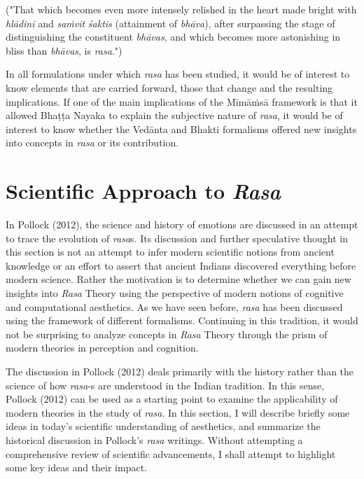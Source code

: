 ("That which becomes even more intensely relished in the heart made bright with \textsl{hlādinī} and \textsl{saṁvit} \textsl{śaktis} (attainment of \textsl{bhāva}), after surpassing the stage of distinguishing the constituent \textsl{bhāvas}, and which becomes more astonishing in bliss than \textsl{bhāvas}, is \textsl{rasa}.")

In all formulations under which \textsl{rasa} has been studied, it would be of interest to know elements that are carried forward, those that change and the resulting implications. If one of the main implications of the Mīmāṁsā framework is that it allowed Bhaṭṭa Nayaka to explain the subjective nature of \textsl{rasa}, it would be of interest to know whether the Vedānta and Bhakti formalisms offered new insights into concepts in \textsl{rasa} or its contribution.\\[-20pt]  

\section*{Scientific Approach to \textsl{Rasa}}

In Pollock (2012), the science and history of emotions are discussed in an attempt to trace the evolution of \textsl{rasa}s. Its discussion and further speculative thought in this section is not an attempt to infer modern scientific notions from ancient knowledge or an effort to assert that ancient Indians discovered everything before modern science. Rather the motivation is to determine whether we can gain new insights into \textsl{Rasa} Theory using the perspective of modern notions of cognitive and computational aesthetics. As we have seen before, \textsl{rasa} has been discussed using the framework of different formalisms. Continuing in this tradition, it would not be surprising to analyze concepts in \textsl{Rasa} Theory through the prism of modern theories in perception and cognition. 

The discussion in Pollock (2012) deals primarily with the history rather than the science of how \textsl{rasa}-s are understood in the Indian tradition. In this sense, Pollock (2012) can be used as a starting point to examine the applicability of modern theories in the study of \textsl{rasa}. In this section, I will describe briefly some ideas in today’s scientific understanding of aesthetics, and summarize the historical discussion in Pollock’s \textsl{rasa} writings. Without attempting a comprehensive review of scientific advancements, I shall attempt to highlight some key ideas and their impact. 

